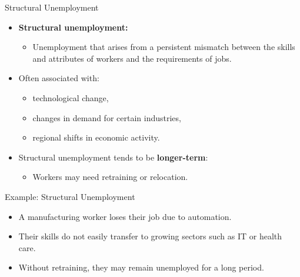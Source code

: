 \documentclass[aspectratio=169]{beamer}
\begin{document}
\begin{frame}{Structural Unemployment}
\transfade
\begin{itemize}[<+->]
  \item \textbf{Structural unemployment:}
  \begin{itemize}[<+->]
    \item Unemployment that arises from a persistent \alert{mismatch} between the skills and attributes of workers and the requirements of jobs.
  \end{itemize}
  \item Often associated with:
  \begin{itemize}[<+->]
    \item technological change,
    \item changes in demand for certain industries,
    \item regional shifts in economic activity.
  \end{itemize}
  \item Structural unemployment tends to be \textbf{longer-term}:
  \begin{itemize}[<+->]
    \item Workers may need retraining or relocation.
  \end{itemize}
\end{itemize}
\end{frame}

\begin{frame}{Example: Structural Unemployment}
\transfade
\begin{itemize}[<+->]
  \item A manufacturing worker loses their job due to automation.
  \item Their skills do not easily transfer to growing sectors such as IT or health care.
  \item Without retraining, they may remain unemployed for a long period.
\end{itemize}
\end{frame}
\end{document}
